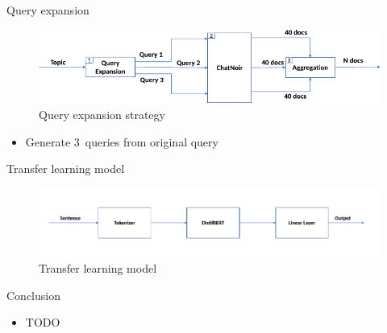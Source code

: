 \documentclass[english]{mlutalk}
\begin{document}
\begin{frame}[allowframebreaks]{Query expansion}
  \begin{figure}
    \centering
    \includegraphics[width=0.8\linewidth]{figures/distilbert-based-arg-retrieval-query-expansion.pdf}
    \caption{Query expansion strategy~\cite{AlhamzehBEM2021}}
    \label{query-expansion}
  \end{figure}

  \begin{itemize}
    \item Generate 3~queries from original query
  \end{itemize}
\end{frame}

\begin{frame}{Transfer learning model~\cite{AlhamzehBEM2021}}
  \begin{figure}
    \centering
    \includegraphics[width=1\linewidth]{figures/distilbert-based-arg-retrieval-processing.pdf}
    \caption{Transfer learning model~\cite{AlhamzehBEM2021}}
    \label{processing}
  \end{figure}
\end{frame}

\begin{frame}{Conclusion}
  \begin{itemize}
    \item TODO
  \end{itemize}
  \thankyou
\end{frame}

\appendix
\section{\appendixname}

\bibliographyframe
\end{document}
